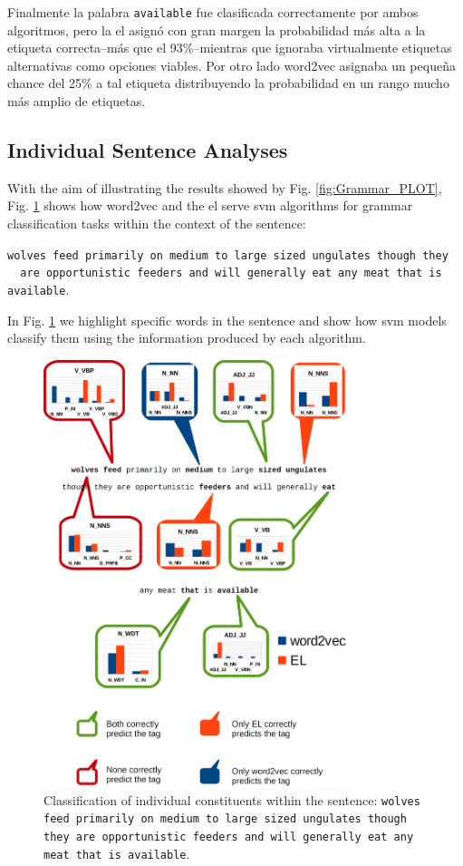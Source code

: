 {Finalmente la palabra \texttt{available} fue clasificada correctamente por ambos algoritmos, pero la \gls{el} asignó con gran margen la probabilidad más alta a la etiqueta correcta--más que el 93\%--mientras que ignoraba virtualmente etiquetas alternativas como opciones viables. Por otro lado word2vec asignaba un pequeña chance del 25\% a tal etiqueta distribuyendo la probabilidad en un rango mucho más amplio de etiquetas.
}{
\subsection{Individual Sentence Analyses}
\label{SentenceAnalysis}

With the aim of illustrating the results showed by Fig. \ref{fig:Grammar_PLOT}, Fig. \ref{fig:Sentence1} shows how word2vec and the \gls{el} serve \gls{svm} algorithms for grammar classification tasks within the context of the sentence:

\begin{sloppypar}
\texttt{wolves feed primarily on medium to large sized ungulates though they ~~are opportunistic feeders and will generally eat any meat that is available}.
\end{sloppypar}

In Fig. \ref{fig:Sentence1} we highlight specific words in the sentence and show how \gls{svm} models classify them using the information produced by each algorithm.

\begin{figure}[ht!]
    \centering
    \includegraphics[width=0.8\textwidth]{Sentence1.png}
    \caption{Classification of individual constituents within the sentence: \texttt{wolves feed primarily on medium to large sized ungulates though they are opportunistic feeders and will generally eat any meat that is available}.}
    \label{fig:Sentence1}
\end{figure}

}
